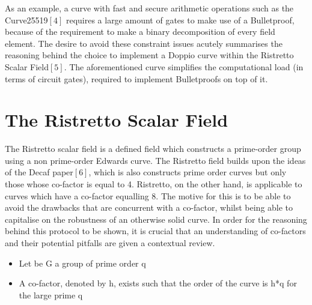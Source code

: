 \documentclass[letterpaper, 10 pt, conference]{ieeeconf}  %
\begin{document}
As an example, a curve with fast and secure arithmetic operations such as the Curve25519$[4]$ requires a large amount of gates to make use of a Bulletproof, because of the requirement to make a binary decomposition of every field element. The desire to avoid these constraint issues acutely summarises the reasoning behind the choice to implement a Doppio curve within the Ristretto Scalar Field$[5]$. The aforementioned curve simplifies the computational load (in terms of circuit gates), required to implement Bulletproofs on top of it.


\section{The Ristretto Scalar Field} 

The Ristretto scalar field is a defined field which constructs a prime-order group using a non prime-order Edwards curve. The Ristretto field builds upon the ideas of the Decaf paper$[6]$, which is also constructs prime order curves but only those whose co-factor is equal to 4. Ristretto, on the other hand, is applicable to curves which have a co-factor equalling 8. The motive for this is to be able to avoid the drawbacks that are concurrent with a co-factor, whilst being able to capitalise on the robustness of an otherwise solid curve. In order for the reasoning behind this protocol to be shown, it is crucial that an understanding of co-factors and their potential pitfalls are given a contextual review. \\
\begin{itemize}
    \item Let be G a group of prime order q 
    \item  A co-factor, denoted by h, exists such that the order of the curve is h*q for the large prime q 
\end{itemize} 
\hfill \break
\end{document}
